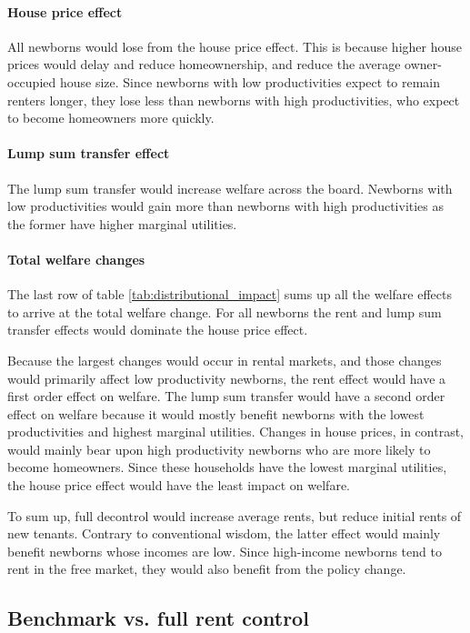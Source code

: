 \documentclass[parskip=full]{article}
\begin{document}
\paragraph{House price effect} All newborns would lose from the house price effect. This is because higher house prices would delay and reduce homeownership, and reduce the average owner-occupied house size. Since newborns with low productivities expect to remain renters longer, they lose less than newborns with high productivities, who expect to become homeowners more quickly. 

\paragraph{Lump sum transfer effect} The lump sum transfer would increase welfare across the board. Newborns with low productivities would gain more than newborns with high productivities as the former have higher marginal utilities.

\paragraph{Total welfare changes} The last row of table \ref{tab:distributional_impact} sums up all the welfare effects to arrive at the total welfare change. For all newborns the rent and lump sum transfer effects would dominate the house price effect.

Because the largest changes would occur in rental markets, and those changes would primarily affect low productivity newborns, the rent effect would have a first order effect on welfare. The lump sum transfer would have a second order effect on welfare because it would mostly benefit newborns with the lowest productivities and highest marginal utilities. Changes in house prices, in contrast, would mainly bear upon high productivity newborns who are more likely to become homeowners. Since these households have the lowest marginal utilities, the house price effect would have the least impact on welfare. 

To sum up, full decontrol would increase average rents, but reduce initial rents of new tenants. Contrary to conventional wisdom, the latter effect would mainly benefit newborns whose incomes are low. Since high-income newborns tend to rent in the free market, they would also benefit from the policy change.

\subsection{Benchmark vs. full rent control}\label{subsection:full_control}
\end{document}
